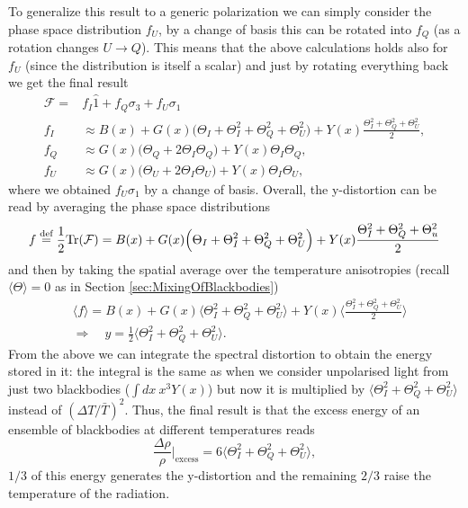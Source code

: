 To generalize this result to a generic polarization we can simply consider the phase space distribution $f_U$, by a change of basis this can be rotated into $f_Q$ (as a rotation changes $U\rightarrow Q$). This means that the above calculations holds also for $f_U$ (since the distribution is itself a scalar) and just by rotating everything back we get the final result
\begin{subequations}\label{eq:y-dist_polarization_components}
\begin{align}
    \mathcal{F}=&f_I\hat 1+f_Q\sigma_3+f_U\sigma_1 \\
    f_I&\approx B(x)+G(x)\Big(\Theta_I+\Theta^2_I+\Theta^2_Q+\Theta^2_U\Big)+Y(x)\frac{\Theta^2_I+\Theta^2_Q+\Theta^2_U}{2},\\
    f_Q&\approx G(x)\Big(\Theta_Q+2\Theta_I\Theta_Q\Big)+Y(x)\Theta_I\Theta_Q,\\
    f_U&\approx G(x)\Big(\Theta_U+2\Theta_I\Theta_U\Big)+Y(x)\Theta_I\Theta_U,
\end{align}
\end{subequations}
where we obtained $f_U\sigma_1$ by a change of basis.
Overall, the y-distortion can be read by averaging the phase space distributions 
$$ f\stackrel{\text{def}}{=}\frac{1}{2}\text{Tr}(\mathcal{F} )= B(x)+G(x)\Big(\Theta_I+\Theta^2_I+\Theta^2_Q+\Theta^2_U\Big)+Y(x)\frac{\Theta^2_I+\Theta^2_Q+\Theta^2_u}{2}$$
and then by taking the spatial average over the temperature anisotropies (recall $\langle\Theta\rangle=0$ as in Section \ref{sec:MixingOfBlackbodies}) 
\begin{align}
    &\langle f\rangle=B(x)+G(x)\Big\langle \Theta^2_I+\Theta^2_Q+\Theta^2_U\Big\rangle+Y(x)\Bigg\langle\frac{\Theta^2_I+\Theta^2_Q+\Theta^2_U}{2}\Bigg\rangle\nonumber\\
    &\Longrightarrow\quad \boxed{y=\frac{1}{2}\Big\langle\Theta^2_I+\Theta^2_Q+\Theta^2_U\Big\rangle}.\label{eq:y-distortion_polarization}
\end{align}
From the above we can integrate the spectral distortion to obtain the energy stored in it: the integral is the same as when we consider unpolarised light from just two blackbodies ($\int dx\ x^3 Y(x)$) but now it is multiplied by $\big\langle\Theta^2_I+\Theta^2_Q+\Theta^2_U\big\rangle$ instead of $(\Delta T/\bar T)^2$. Thus, the final result is that the excess energy of an ensemble of blackbodies at different temperatures reads 
\begin{equation}
    \frac{\Delta \rho}{\rho}\bigg|_\text{excess}=6\Big\langle\Theta^2_I+\Theta^2_Q+\Theta^2_U\Big\rangle,\label{eq:polarize_mixing_excess_energy}
\end{equation}
$1/3$ of this energy generates the y-distortion and the remaining $2/3$ raise the temperature of the radiation.

